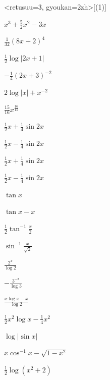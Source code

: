\documentclass[10pt, uplatex, dvipdfmx]{jsarticle}
\theoremstyle{definition}
\numberwithin{equation}{section}
\newcommand{\ds}{\displaystyle}
\begin{document}
\begin{edaenumerate}<retusuu=3, gyoukan=2zh>[(1)]
  
\item $\ds x^3 +\frac{5}{2}x^2-3x$

\item $\ds \frac{1}{32}\left(8x+2\right)^4$

\item $\ds \frac{1}{2}\log\left| 2x+1\right|$

\item $\ds -\frac{1}{4}\left( 2x+3\right)^{-2}$

\item $\ds 2\log | x | + x^{-2}$

\item $\ds \frac{15}{16} x^{\frac{16}{15}}$

\item $\ds \frac{1}{2}x+\frac{1}{4}\sin 2x$

\item $\ds \frac{1}{2}x-\frac{1}{4}\sin 2x$

\item $\ds \frac{1}{2}x+\frac{1}{4}\sin 2x$

\item $\ds \frac{1}{2}x-\frac{1}{4}\sin 2x$

\item $\ds \tan x$

\item $\ds \tan x - x$

\item $\ds \frac{1}{2} \tan^{-1}\frac{x}{2}$

\item $\ds \sin^{-1}\frac{x}{\sqrt{2}}$

\item $\ds \frac{2^x}{\log 2}$

\item $\ds -\frac{3^{-x}}{\log 3}$

\item $\ds \frac{x \log x - x}{\log 2}$

\item $\ds \frac{1}{2}x^2 \log x - \frac{1}{4}x^2$

\item $\ds \log\left| \sin x\right|$

\item $\ds x \cos^{-1} x -\sqrt{1-x^2}$

\item $\ds \frac{1}{2}\log \left( x^2+2\right)$


\end{edaenumerate}
\end{document}
